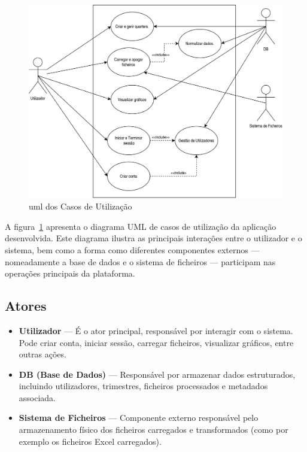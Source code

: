 \begin{figure}[h]
\centering
\includegraphics[width=14cm]{./img/usecase_uml}
\caption{\gls{uml} dos Casos de Utilização}
\label{fig:umlCasosUtilizacao}
\end{figure}

A figura~\ref{fig:umlCasosUtilizacao} apresenta o diagrama UML de casos de utilização da aplicação desenvolvida. Este diagrama ilustra as principais interações entre o utilizador e o sistema, bem como a forma como diferentes componentes externos — nomeadamente a base de dados e o sistema de ficheiros — participam nas operações principais da plataforma.

\subsection*{Atores}
\begin{itemize}
    \item \textbf{Utilizador} — É o ator principal, responsável por interagir com o sistema. Pode criar conta, iniciar sessão, carregar ficheiros, visualizar gráficos, entre outras ações.
    \item \textbf{DB (Base de Dados)} — Responsável por armazenar dados estruturados, incluindo utilizadores, trimestres, ficheiros processados e metadados associada.
    \item \textbf{Sistema de Ficheiros} — Componente externo responsável pelo armazenamento físico dos ficheiros carregados e transformados (como por exemplo os ficheiros Excel carregados).
\end{itemize}

